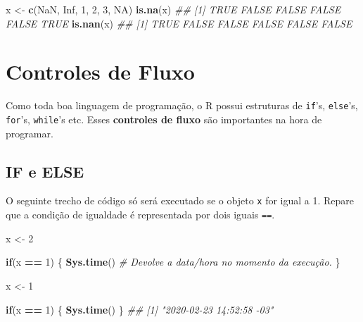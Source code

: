 \documentclass[]{book}
\newenvironment{Shaded}{\begin{snugshade}}{\end{snugshade}}
\newcommand{\CommentTok}[1]{\textcolor[rgb]{0.56,0.35,0.01}{\textit{#1}}}
\newcommand{\ControlFlowTok}[1]{\textcolor[rgb]{0.13,0.29,0.53}{\textbf{#1}}}
\newcommand{\DecValTok}[1]{\textcolor[rgb]{0.00,0.00,0.81}{#1}}
\newcommand{\KeywordTok}[1]{\textcolor[rgb]{0.13,0.29,0.53}{\textbf{#1}}}
\newcommand{\NormalTok}[1]{#1}
\newcommand{\OperatorTok}[1]{\textcolor[rgb]{0.81,0.36,0.00}{\textbf{#1}}}
\newcommand{\OtherTok}[1]{\textcolor[rgb]{0.56,0.35,0.01}{#1}}
\newcommand{\StringTok}[1]{\textcolor[rgb]{0.31,0.60,0.02}{#1}}
\begin{document}
\begin{Shaded}
\begin{Highlighting}[]
\NormalTok{x <-}\StringTok{ }\KeywordTok{c}\NormalTok{(}\OtherTok{NaN}\NormalTok{, }\OtherTok{Inf}\NormalTok{, }\DecValTok{1}\NormalTok{, }\DecValTok{2}\NormalTok{, }\DecValTok{3}\NormalTok{, }\OtherTok{NA}\NormalTok{)}
\KeywordTok{is.na}\NormalTok{(x)}
\CommentTok{## [1]  TRUE FALSE FALSE FALSE FALSE  TRUE}
\KeywordTok{is.nan}\NormalTok{(x)}
\CommentTok{## [1]  TRUE FALSE FALSE FALSE FALSE FALSE}
\end{Highlighting}
\end{Shaded}

\hypertarget{controles-de-fluxo}{%
\section{Controles de Fluxo}\label{controles-de-fluxo}}

Como toda boa linguagem de programação, o R possui estruturas de \texttt{if}'s, \texttt{else}'s, \texttt{for}'s, \texttt{while}'s etc. Esses \textbf{controles de fluxo} são importantes na hora de programar.

\hypertarget{if-e-else}{%
\subsection{IF e ELSE}\label{if-e-else}}

O seguinte trecho de código só será executado se o objeto \texttt{x} for igual a 1. Repare que a condição de igualdade é representada por dois iguais \texttt{==}.

\begin{Shaded}
\begin{Highlighting}[]
\NormalTok{x <-}\StringTok{ }\DecValTok{2}

\ControlFlowTok{if}\NormalTok{(x }\OperatorTok{==}\StringTok{ }\DecValTok{1}\NormalTok{) \{         }
  \KeywordTok{Sys.time}\NormalTok{()      }\CommentTok{# Devolve a data/hora no momento da execução.}
\NormalTok{\}}
\end{Highlighting}
\end{Shaded}

\begin{Shaded}
\begin{Highlighting}[]
\NormalTok{x <-}\StringTok{ }\DecValTok{1}

\ControlFlowTok{if}\NormalTok{(x }\OperatorTok{==}\StringTok{ }\DecValTok{1}\NormalTok{) \{}
  \KeywordTok{Sys.time}\NormalTok{()}
\NormalTok{\}}
\CommentTok{## [1] "2020-02-23 14:52:58 -03"}
\end{Highlighting}
\end{Shaded}
\end{document}
